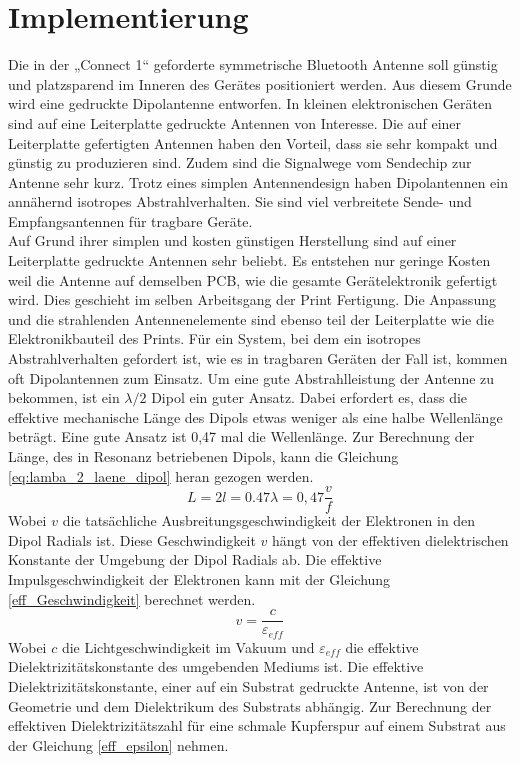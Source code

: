\section{Implementierung}\label{sec:Implementierung}
Die in der „Connect  1“ geforderte symmetrische Bluetooth Antenne soll günstig und platzsparend im Inneren des Gerätes positioniert werden. Aus diesem Grunde wird eine gedruckte Dipolantenne entworfen. In kleinen  elektronischen Geräten sind auf eine Leiterplatte gedruckte Antennen  von Interesse. Die auf einer Leiterplatte gefertigten Antennen haben den Vorteil, dass sie sehr kompakt und günstig zu produzieren sind. Zudem sind die Signalwege vom Sendechip zur Antenne sehr kurz. Trotz eines simplen Antennendesign haben Dipolantennen  ein annähernd isotropes Abstrahlverhalten. Sie sind viel verbreitete Sende- und Empfangsantennen für tragbare Geräte. \\

Auf Grund ihrer simplen und kosten günstigen  Herstellung sind auf  einer Leiterplatte gedruckte Antennen sehr beliebt. Es entstehen nur geringe Kosten weil die Antenne auf demselben PCB, wie die gesamte Gerätelektronik gefertigt wird. Dies geschieht im selben Arbeitsgang der Print Fertigung. Die  Anpassung und die strahlenden  Antennenelemente sind ebenso teil der Leiterplatte wie die Elektronikbauteil des Prints. Für ein System, bei dem ein isotropes Abstrahlverhalten gefordert ist, wie es in tragbaren Geräten der Fall ist, kommen oft Dipolantennen zum Einsatz. 
Um eine gute Abstrahlleistung der Antenne zu bekommen, ist ein $\lambda /2$ Dipol ein guter Ansatz. Dabei erfordert es, dass die effektive mechanische Länge des Dipols etwas weniger als eine halbe Wellenlänge beträgt. Eine gute Ansatz ist 0,47 mal die Wellenlänge. 
Zur Berechnung der Länge, des in Resonanz betriebenen Dipols, kann die  Gleichung \ref{eq:lamba_2_laene_dipol} heran gezogen werden.
\begin{equation}\label{eq:lamba_2_laene_dipol}
L=2l = 0.47 \lambda= 0,47 \dfrac{v}{f}
\end{equation} 
Wobei $v$ die tatsächliche Ausbreitungsgeschwindigkeit der Elektronen in den Dipol Radials ist. Diese Geschwindigkeit $v$ hängt von der effektiven dielektrischen Konstante der Umgebung der Dipol Radials ab. 
Die effektive  Impulsgeschwindigkeit der Elektronen kann mit der Gleichung \ref{eff_Geschwindigkeit} berechnet werden. 
\begin{equation}\label{eff_Geschwindigkeit}
v = \dfrac{c}{\varepsilon_{eff}}
\end{equation}
Wobei $c$ die Lichtgeschwindigkeit im Vakuum und $\varepsilon_{eff}$  die effektive Dielektrizitätskonstante des umgebenden Mediums ist. Die effektive Dielektrizitätskonstante, einer auf ein Substrat gedruckte Antenne, ist von der  Geometrie und dem Dielektrikum des Substrats abhängig. Zur Berechnung der effektiven Dielektrizitätszahl für eine schmale Kupferspur auf einem Substrat aus der Gleichung \ref{eff_epsilon} nehmen. 

